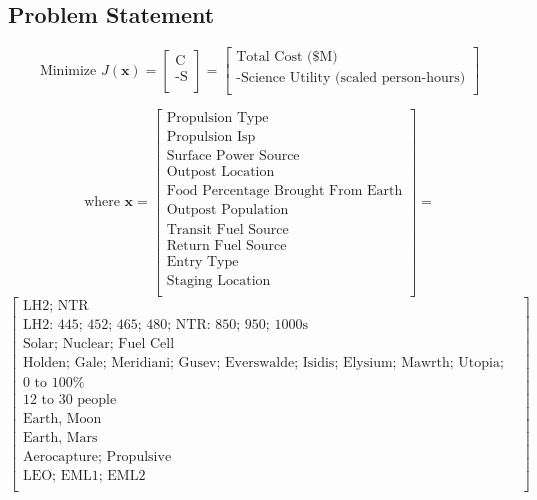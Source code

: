\documentclass[]{aiaa-pretty}
\begin{document}
\subsection{Problem Statement}
\begin{equation*}
\mbox{Minimize } J(\mathbf{x})
=
\begin{bmatrix}
\mbox{C}\\
\mbox{-S}\\
\end{bmatrix}
=
\begin{bmatrix}
\mbox{Total Cost (\$M)}\\
\mbox{-Science Utility (scaled person-hours)}\\
\end{bmatrix}
\end{equation*}

\begin{equation*}
\mbox{where } \mathbf{x}
=
\begin{bmatrix}
\mbox{Propulsion Type}\\
\mbox{Propulsion Isp}\\
\mbox{Surface Power Source}\\
\mbox{Outpost Location}\\
\mbox{Food Percentage Brought From Earth}\\
\mbox{Outpost Population}\\
\mbox{Transit Fuel Source}\\
\mbox{Return Fuel Source}\\
\mbox{Entry Type}\\
\mbox{Staging Location}\\
\end{bmatrix}
=
\end{equation*}
\begin{equation*}
\begin{bmatrix}
\mbox{LH2; NTR}\\
\mbox{LH2: 445; 452; 465; 480; NTR: 850; 950; 1000s}\\
\mbox{Solar; Nuclear; Fuel Cell}\\
\mbox{Holden; Gale; Meridiani; Gusev; Everswalde; Isidis; Elysium; Mawrth; Utopia; Planus Boreum; Hellas; Amazonis}\\
\mbox{0 to 100\%}\\
\mbox{12 to 30 people}\\
\mbox{Earth, Moon}\\
\mbox{Earth, Mars}\\
\mbox{Aerocapture; Propulsive}\\
\mbox{LEO; EML1; EML2}\\
\end{bmatrix}
\end{equation*}
\end{document}

